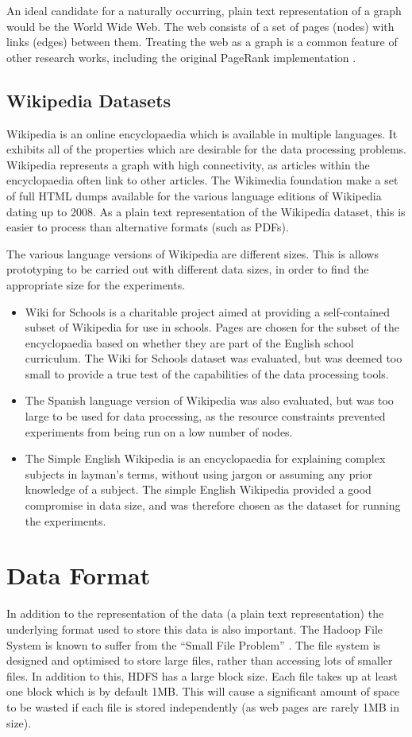 An ideal candidate for a naturally occurring, plain text representation of a graph would be the World Wide Web. The web consists of a set of pages (nodes) with links (edges) between them. Treating the web as a graph is a common feature of other research works, including the original PageRank implementation \cite{page1999pagerank}.

\subsection{Wikipedia Datasets}
Wikipedia is an online encyclopaedia which is available in multiple languages. It exhibits all of the properties which are desirable for the data processing problems. Wikipedia represents a graph with high connectivity, as articles within the encyclopaedia often link to other articles. The Wikimedia foundation make a set of full HTML dumps available for the various language editions of Wikipedia dating up to 2008. As a plain text representation of the Wikipedia dataset, this is easier to process than alternative formats (such as PDFs). 

The various language versions of Wikipedia are different sizes. This is allows prototyping to be carried out with different data sizes, in order to find the appropriate size for the experiments.

\begin{itemize}
	\item Wiki for Schools is a charitable project aimed at providing a self-contained subset of Wikipedia for use in schools. Pages are chosen for the subset of the encyclopaedia based on whether they are part of the English school curriculum. The Wiki for Schools dataset was evaluated, but was deemed too small to provide a true test of the capabilities of the data processing tools.
	\item The Spanish language version of Wikipedia was also evaluated, but was too large to be used for data processing, as the resource constraints prevented experiments from being run on a low number of nodes.
	\item The Simple English Wikipedia is an encyclopaedia for explaining complex subjects in layman's terms, without using jargon or assuming any prior knowledge of a subject. The simple English Wikipedia provided a good compromise in data size, and was therefore chosen as the dataset for running the experiments.
\end{itemize}

\section{Data Format}
In addition to the representation of the data (a plain text representation) the underlying format used to store this data is also important. The Hadoop File System is known to suffer from the ``Small File Problem'' \cite{hdfsSmallFiles}. The file system is designed and optimised to store large files, rather than accessing lots of smaller files. In addition to this, HDFS has a large block size. Each file takes up at least one block which is by default 1MB. This will cause a significant amount of space to be wasted if each file is stored independently (as web pages are rarely 1MB in size).

